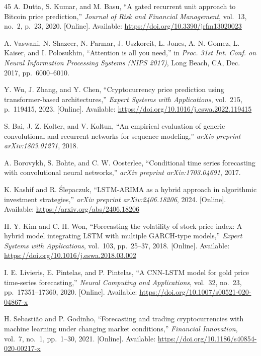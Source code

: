 \documentclass[conference]{IEEEtran}
\begin{document}
\begin{thebibliography}{45}
A. Dutta, S. Kumar, and M. Basu, ``A gated recurrent unit approach to Bitcoin price prediction,'' \textit{Journal of Risk and Financial Management}, vol.~13, no.~2, p.~23, 2020. [Online]. Available: \url{https://doi.org/10.3390/jrfm13020023}

A. Vaswani, N. Shazeer, N. Parmar, J. Uszkoreit, L. Jones, A. N. Gomez, L. Kaiser, and I. Polosukhin, ``Attention is all you need,'' in \textit{Proc. 31st Int. Conf. on Neural Information Processing Systems (NIPS 2017)}, Long Beach, CA, Dec. 2017, pp.~6000--6010.

Y. Wu, J. Zhang, and Y. Chen, ``Cryptocurrency price prediction using transformer-based architectures,'' \textit{Expert Systems with Applications}, vol.~215, p.~119415, 2023. [Online]. Available: \url{https://doi.org/10.1016/j.eswa.2022.119415}

S. Bai, J. Z. Kolter, and V. Koltun, ``An empirical evaluation of generic convolutional and recurrent networks for sequence modeling,'' \textit{arXiv preprint arXiv:1803.01271}, 2018.

A. Borovykh, S. Bohte, and C. W. Oosterlee, ``Conditional time series forecasting with convolutional neural networks,'' \textit{arXiv preprint arXiv:1703.04691}, 2017.

K. Kashif and R. \'Slepaczuk, ``LSTM-ARIMA as a hybrid approach in algorithmic investment strategies,'' \textit{arXiv preprint arXiv:2406.18206}, 2024. [Online]. Available: \url{https://arxiv.org/abs/2406.18206}

H. Y. Kim and C. H. Won, ``Forecasting the volatility of stock price index: A hybrid model integrating LSTM with multiple GARCH-type models,'' \textit{Expert Systems with Applications}, vol.~103, pp.~25--37, 2018. [Online]. Available: \url{https://doi.org/10.1016/j.eswa.2018.03.002}

I. E. Livieris, E. Pintelas, and P. Pintelas, ``A CNN-LSTM model for gold price time-series forecasting,'' \textit{Neural Computing and Applications}, vol.~32, no.~23, pp.~17351--17360, 2020. [Online]. Available: \url{https://doi.org/10.1007/s00521-020-04867-x}

H. Sebasti\~{a}o and P. Godinho, ``Forecasting and trading cryptocurrencies with machine learning under changing market conditions,'' \textit{Financial Innovation}, vol.~7, no.~1, pp.~1--30, 2021. [Online]. Available: \url{https://doi.org/10.1186/s40854-020-00217-x}


\end{thebibliography}
\end{document}
